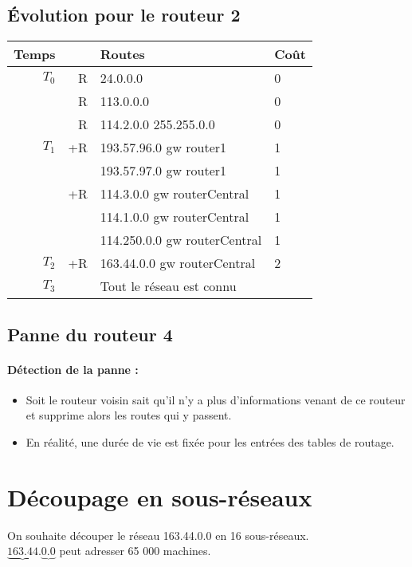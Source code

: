 \documentclass{article}
\begin{document}
\subsection{\'Evolution pour le routeur 2}
\begin{supertabular}{|rrll|}
	\hline

	\textbf{Temps} & & \textbf{Routes} & \textbf{Co\^ut} \\
	
	\hline

	$T_{0}$ & R & 24.0.0.0 & 0 \\
	& R & 113.0.0.0 & 0 \\
	& R & 114.2.0.0 255.255.0.0 & 0 \\
	
	\hline
	
	$T_{1}$ & +R & 193.57.96.0 gw router1 & 1 \\
	& & 193.57.97.0 gw router1 & 1 \\
	& +R & 114.3.0.0 gw routerCentral & 1 \\
	& & 114.1.0.0 gw routerCentral & 1 \\
	& & 114.250.0.0 gw routerCentral & 1 \\
	
	\hline
	
	$T_{2}$ & +R & 163.44.0.0 gw routerCentral & 2 \\
	
	\hline
	
	$T_{3}$ & & Tout le réseau est connu & \\
	
	\hline
\end{supertabular}

\subsection{Panne du routeur 4}
\paragraph{Détection de la panne :}
\begin{itemize}
	\item Soit le routeur voisin sait qu'il n'y a plus d'informations venant de ce routeur et supprime alors les routes qui y passent.
	\item En réalité, une durée de vie est fixée pour les entrées des tables de routage.
\end{itemize}

\section{Découpage en sous-réseaux}
On souhaite découper le réseau 163.44.0.0 en 16 sous-réseaux.\\
$\underbrace{163.44}.\underbrace{0.0}$ peut adresser 65 000 machines.\\
\end{document}
